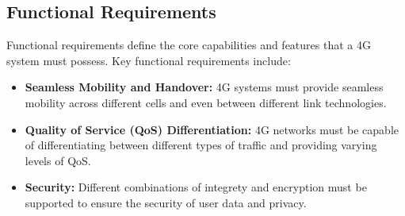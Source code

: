 \subsection{Functional Requirements}

Functional requirements define the core capabilities and features that a 4G system must possess. Key functional requirements include:

\begin{itemize}
    \item \textbf{Seamless Mobility and Handover:} 4G systems must provide seamless mobility across different cells and even between different link technologies.
    \item \textbf{Quality of Service (QoS) Differentiation:} 4G networks must be capable of differentiating between different types of traffic and providing varying levels of QoS.
    \item \textbf{Security:} Different combinations of integrety and encryption must be supported to ensure the security of user data and privacy.
\end{itemize}